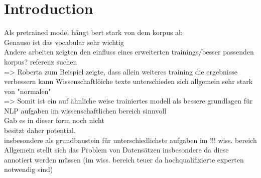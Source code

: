 \chapter{Introduction}
Als pretrained model hängt bert stark von dem korpus ab\\
Genauso ist das vocabular sehr wichtig\\
Andere arbeiten zeigten den einfluss eines erweiterten trainings/besser passenden korpus? referenz suchen\\
=> Roberta zum Beispiel zeigte, dass allein weiteres training die ergebnisse verbessern kann 
Wissenschaftlöiche texte unterschieden sich allgemein sehr stark von "normalen"\\
=> Somit ist ein auf ähnliche weise trainiertes modell als bessere grundlagen für NLP aufgaben im wissenschaftlichen bereich sinnvoll\\
Gab es in dieser form noch nicht\\
besitzt daher potential.\\
insbesondere als grundbaustein für unterschiedlichste aufgaben im !!! wiss. bereich\\
Allgemein stellt sich das Problem von Datensätzen insbesondere da diese annotiert werden müssen (im wiss. bereich teuer da hochqualifizierte experten notwendig sind)\\